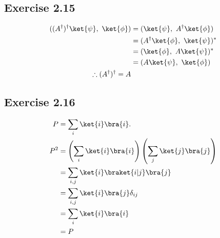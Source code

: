 \documentclass[a4paper,12pt]{article}
\begin{document}
\subsection*{Exercise 2.15}
\begin{align*}
	((A^\dagger)^\dagger\ket{\psi},\ \ket{\phi} )
	&= (\ket{\psi},\ A^\dagger \ket{\phi})\\
	&= (A^\dagger \ket{\phi},\ \ket{\psi})^*\\
	&= (\ket{\phi},\ A\ket{\psi})^*\\
	&= (A\ket{\psi},\ \ket{\phi})\\
	\therefore (A^\dagger)^\dagger = A
\end{align*}


\subsection*{Exercise 2.16}
\begin{align*}
	P &= \sum_i \ket{i}\bra{i}.\\
	P^2 &= \left(\sum_i \ket{i}\bra{i}\right) \left(\sum_j \ket{j}\bra{j}\right)\\
	&= \sum_{i,j} \ket{i}\braket{i | j}\bra{j}\\
	&= \sum_{i,j} \ket{i}\bra{j} \delta_{ij}\\
	&= \sum_i \ket{i}\bra{i}\\
	&= P
\end{align*}
\end{document}
